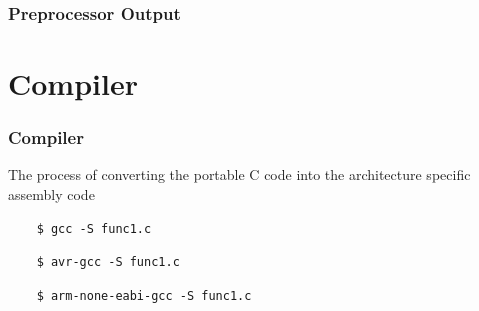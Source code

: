 \documentclass[]{beamer}
\begin{document}
\begin{frame}[fragile]
\frametitle{Preprocessor Output} 
\begin{minipage}[t]{0.45\linewidth}
  
\end{minipage}


\end{frame}










\section{Compiler}
\begin{frame}[fragile]
  \frametitle{Compiler}
  The process of converting the portable C code into the architecture specific assembly code

  \begin{lstlisting}
    $ gcc -S func1.c
  \end{lstlisting}

  \begin{lstlisting}
    $ avr-gcc -S func1.c
  \end{lstlisting}

  \begin{lstlisting}
    $ arm-none-eabi-gcc -S func1.c
  \end{lstlisting}
  
\end{frame}

\begin{frame}[fragile]

  \newsavebox{\mybox}
  \begin{lrbox}{\mybox}%

    \begin{minipage}[t]{0.33\linewidth}
        
    \end{minipage}
    
    \hfill\vrule\hfill

    \begin{minipage}[t]{0.33\linewidth}
        
      \end{minipage}

    \hfill\vrule\hfill
    
    \begin{minipage}[t]{0.33\linewidth}
        
      \end{minipage}
    \end{lrbox}
  
    \scalebox{0.55}{\usebox{\mybox}}
  \end{frame}
\end{document}
